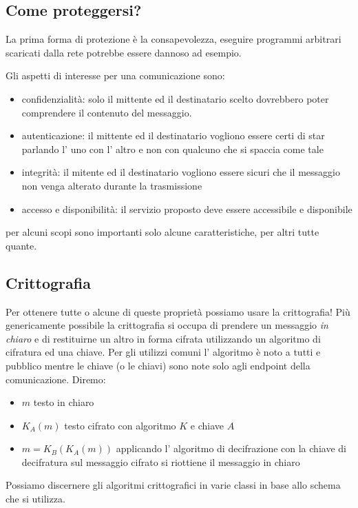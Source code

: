 \subsection{Come proteggersi?}
La prima forma di protezione è la consapevolezza, eseguire programmi arbitrari scaricati dalla rete potrebbe essere dannoso ad esempio.

Gli aspetti di interesse per una comunicazione sono:
\begin{itemize}
    \item confidenzialità: solo il mittente ed il destinatario scelto dovrebbero poter comprendere il contenuto del messaggio.
    
    \item autenticazione: il mittente ed il destinatario vogliono essere certi di star parlando l' uno con l' altro e non con qualcuno che si spaccia come tale
    
    \item integrità: il mitente ed il destinatario vogliono essere sicuri che il messaggio non venga alterato durante la trasmissione
    
    \item accesso e disponibilità: il servizio proposto deve essere accessibile e disponibile
\end{itemize}
per alcuni scopi sono importanti solo alcune caratteristiche, per altri tutte quante.

\subsection{Crittografia}
Per ottenere tutte o alcune di queste proprietà possiamo usare la crittografia!
Più genericamente possibile la crittografia si occupa di prendere un messaggio \emph{in chiaro} e di restituirne un altro in forma cifrata utilizzando un algoritmo di cifratura ed una chiave.
Per gli utilizzi comuni l' algoritmo è noto a tutti e pubblico mentre le chiave (o le chiavi) sono note solo agli endpoint della comunicazione.
Diremo:
\begin{itemize}
    \item $m$ testo in chiaro
    \item $K_A(m)$ testo cifrato con algoritmo $K$ e chiave $A$
    \item $m = K_B(K_A(m))$ applicando l' algoritmo di decifrazione con la chiave di decifratura sul messaggio cifrato si riottiene il messaggio in chiaro
\end{itemize}

Possiamo discernere gli algoritmi crittografici in varie classi in base allo schema che si utilizza.

